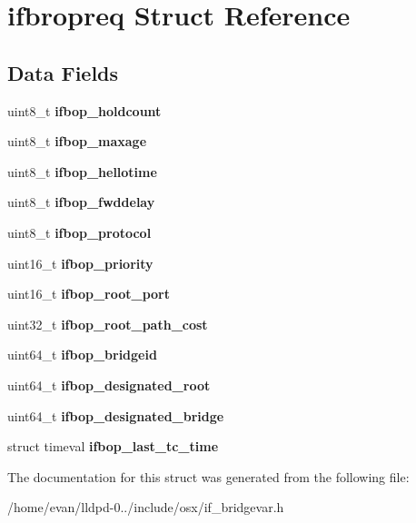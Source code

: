 \section{ifbropreq \-Struct \-Reference}
\label{structifbropreq}
\subsection*{\-Data \-Fields}
\begin{DoxyCompactItemize}
\item 
uint8\-\_\-t {\bfseries ifbop\-\_\-holdcount}\label{structifbropreq_a44489abe6acf40a6f6597eb9b38746d1}

\item 
uint8\-\_\-t {\bfseries ifbop\-\_\-maxage}\label{structifbropreq_a111a90d8df2702e574174403434d636f}

\item 
uint8\-\_\-t {\bfseries ifbop\-\_\-hellotime}\label{structifbropreq_abaa9056dc9b5f0520584a56f43a3b1b6}

\item 
uint8\-\_\-t {\bfseries ifbop\-\_\-fwddelay}\label{structifbropreq_a41abdc5bc7fc9bf472a62274a9562b0a}

\item 
uint8\-\_\-t {\bfseries ifbop\-\_\-protocol}\label{structifbropreq_ae87504d09a28264864b364674ee121a1}

\item 
uint16\-\_\-t {\bfseries ifbop\-\_\-priority}\label{structifbropreq_ae8a3076cc273cfb678560c1ae1c960f4}

\item 
uint16\-\_\-t {\bfseries ifbop\-\_\-root\-\_\-port}\label{structifbropreq_a4ba49f527d2cd3c2196af21574efaaf1}

\item 
uint32\-\_\-t {\bfseries ifbop\-\_\-root\-\_\-path\-\_\-cost}\label{structifbropreq_ab25ce94625327c918486228da24492c3}

\item 
uint64\-\_\-t {\bfseries ifbop\-\_\-bridgeid}\label{structifbropreq_a498873a7445f05bcd69ed7789497b84f}

\item 
uint64\-\_\-t {\bfseries ifbop\-\_\-designated\-\_\-root}\label{structifbropreq_a1cea1e36da1e1c4bbb8790ff4355d11c}

\item 
uint64\-\_\-t {\bfseries ifbop\-\_\-designated\-\_\-bridge}\label{structifbropreq_a6846b3ed24819d6394693d4a632c599e}

\item 
struct timeval {\bfseries ifbop\-\_\-last\-\_\-tc\-\_\-time}\label{structifbropreq_a33598b3191e47a7af64679448401dd99}

\end{DoxyCompactItemize}


\-The documentation for this struct was generated from the following file\-:\begin{DoxyCompactItemize}
\item 
/home/evan/lldpd-\/0../include/osx/if\-\_\-bridgevar.\-h\end{DoxyCompactItemize}
